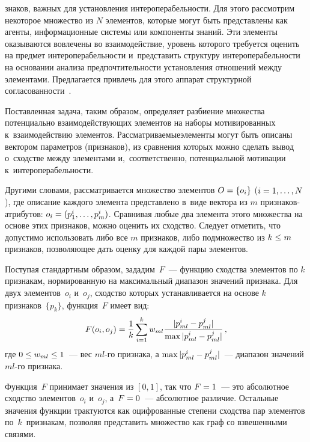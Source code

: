 \begin{multicols}{2}

\noindent
знаков, 
важ\-ных для установления ин\-тер\-опе\-ра\-бель\-ности. Для этого рас\-смот\-рим 
некоторое множество из $N$ элементов, которые могут быть пред\-став\-ле\-ны 
как агенты, информационные сис\-те\-мы или компоненты знаний. Эти 
элементы оказываются вовлечены во взаимодействие, уровень которого 
требуется оценить на предмет ин\-тер\-опе\-ра\-бель\-ности и~представить структуру 
ин\-тер\-опе\-ра\-бель\-ности на основании анализа предпочтительности 
установления отношений между элементами. Предлагается при\-влечь для 
этого аппарат структурной со\-гла\-со\-ван\-ности~\cite{4-dul}. 
     
     Поставленная задача, таким образом, определяет разбиение множества 
потенциально взаимодействующих элементов на наборы мотивированных 
к~взаимодействию элементов. Рас\-смат\-ри\-ва\-емые\linebreak элементы могут быть 
описаны вектором па\-ра\-мет\-ров (признаков), из срав\-не\-ния которых можно 
\mbox{сделать} вывод о~сходстве между элементами и,~соответственно, 
потенциальной мотивации к~ин\-тер\-опе\-ра\-бель\-ности.
     
     Другими словами, рас\-смат\-ри\-ва\-ет\-ся множество элементов $O\hm = 
\{o_i\}$ ($i \hm= 1, \ldots , N$), где описание каж\-до\-го элемента пред\-став\-ле\-но 
в~виде вектора из $m$ приз\-на\-ков-ат\-ри\-бу\-тов: $o_i \hm= (p_1^i, \ldots, p_m^i)$. 
Сравнивая любые два элемента этого множества на основе этих признаков, 
мож\-но оценить их сходство. Следует отметить, что допустимо использовать 
либо все $m$ признаков, либо подмножество из $k\hm\leq m$ признаков, 
поз\-во\-ля\-ющее дать оцен\-ку для каж\-дой пары элементов.
     
     Поступая стандартным образом, зададим~$F$~--- функцию сходства 
элементов по $k$ признакам, нормированную на максимальный диапазон 
значений признака. Для двух элементов~$o_i$ и~$o_j$, сходство которых 
уста\-нав\-ли\-ва\-ет\-ся на осно\-ве $k$ признаков~$\{p_k\}$, функция~$F$ имеет вид:
     $$
     F(o_i,o_j) =\displaystyle\frac{\displaystyle 1\mathstrut}{\displaystyle k\mathstrut}\sum\limits_{i=1}^k  w_{ml}\displaystyle\frac{\displaystyle \vert p^i_{ml}-
p^j_{ml}\vert\mathstrut}{\displaystyle \max \vert p^i_{ml}-p^j_{ml}\vert\mathstrut}\,,
     $$
где $0 \leq w_{ml} \hm\leq 1$~--- вес $ml$-го признака, а $\max \vert p^i_{ml} \hm- 
p_{ml}^j\vert$~--- диапазон значений $ml$-го признака.
     
     Функция~$F$ принимает значения из $[0,1]$, так что $F \hm=1$~--- это 
абсолютное сходство элементов~$o_i$ и~$o_j$, а~$F\hm=0$~--- абсолютное 
различие. Остальные значения функции трак\-ту\-ют\-ся как оциф\-ро\-ван\-ные 
степени сходства пар элементов по~$k$~признакам, позволяя пред\-ста\-вить 
множество как граф со взвешенными связями. 
     

\end{multicols}
